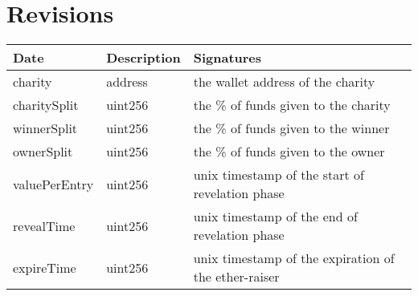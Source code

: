 \documentclass[11pt]{article}
\begin{document}
\section{Revisions}
\label{sec:revisions}

\begin{table}[H]
\begin{center}
\begin{tabular}{| l | l | l |}
\hline
\textbf{Date} & \textbf{Description} & \textbf{Signatures} \\ \hline
charity & address & the wallet address of the charity \\ \hline
charitySplit & uint256 & the \% of funds given to the charity \\ \hline
winnerSplit & uint256 & the \% of funds given to the winner \\ \hline
ownerSplit & uint256 & the \% of funds given to the owner \\ \hline
valuePerEntry & uint256 & unix timestamp of the start of revelation phase \\ \hline
revealTime & uint256 & unix timestamp of the end of revelation phase \\ \hline
expireTime & uint256 & unix timestamp of the expiration of the ether-raiser \\ \hline
\end{tabular}
\end{center}
\end{table}

\vspace*{\fill}

\begin{flushright}

\pdfcreationdate
\end{flushright}
\end{document}
